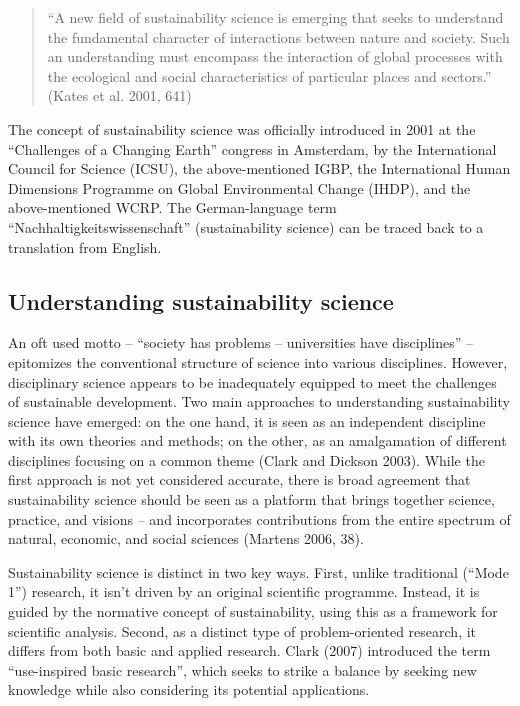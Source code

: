 \documentclass[
  a4paper,
  DIV=11,
  numbers=noendperiod,
  oneside,
  openany]{scrreprt}
\begin{document}
\begin{quote}
``A new field of sustainability science is emerging that seeks to
understand the fundamental character of interactions between nature and
society. Such an understanding must encompass the interaction of global
processes with the ecological and social characteristics of particular
places and sectors.'' (Kates et al. 2001, 641)
\end{quote}

The concept of sustainability science was officially introduced in 2001
at the ``Challenges of a Changing Earth'' congress in Amsterdam, by the
International Council for Science (ICSU), the above-mentioned IGBP, the
International Human Dimensions Programme on Global Environmental Change
(IHDP), and the above-mentioned WCRP. The German-language term
``Nachhaltigkeitswissenschaft'' (sustainability science) can be traced
back to a translation from English.

\subsection{Understanding sustainability
science}\label{understanding-sustainability-science}

An oft used motto -- ``society has problems -- universities have
disciplines'' -- epitomizes the conventional structure of science into
various disciplines. However, disciplinary science appears to be
inadequately equipped to meet the challenges of sustainable development.
Two main approaches to understanding sustainability science have
emerged: on the one hand, it is seen as an independent discipline with
its own theories and methods; on the other, as an amalgamation of
different disciplines focusing on a common theme (Clark and Dickson
2003). While the first approach is not yet considered accurate, there is
broad agreement that sustainability science should be seen as a platform
that brings together science, practice, and visions -- and incorporates
contributions from the entire spectrum of natural, economic, and social
sciences (Martens 2006, 38).

Sustainability science is distinct in two key ways. First, unlike
traditional (``Mode 1'') research, it isn't driven by an original
scientific programme. Instead, it is guided by the normative concept of
sustainability, using this as a framework for scientific analysis.
Second, as a distinct type of problem-oriented research, it differs from
both basic and applied research. Clark (2007) introduced the term
``use-inspired basic research'', which seeks to strike a balance by
seeking new knowledge while also considering its potential applications.
\end{document}
